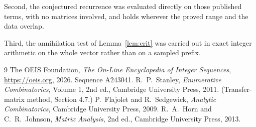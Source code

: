 \documentclass[11pt,a4paper]{article}
\theoremstyle{plain}
\theoremstyle{definition}
\begin{document}
Second, the conjectured recurrence was evaluated directly on those published terms, with no
matrices involved, and holds wherever the proved range and the data overlap.

Third, the annihilation test of Lemma~\ref{lem:crit} was carried out in exact integer
arithmetic on the whole vector rather than on a sampled prefix.

\begin{thebibliography}{9}
 The OEIS Foundation, \emph{The On-Line Encyclopedia of Integer
Sequences}, \url{https://oeis.org}, 2026. Sequence A243041.
 R.~P.~Stanley, \emph{Enumerative Combinatorics}, Volume 1, 2nd ed.,
Cambridge University Press, 2011. (Transfer-matrix method, Section 4.7.)
 P.~Flajolet and R.~Sedgewick, \emph{Analytic Combinatorics}, Cambridge
University Press, 2009.
 R.~A.~Horn and C.~R.~Johnson, \emph{Matrix Analysis}, 2nd ed., Cambridge
University Press, 2013.
\end{thebibliography}
\end{document}

